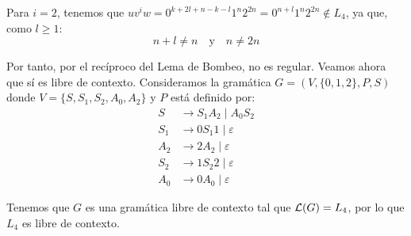 \begin{ejercicio}
\begin{enumerate}
        Para $i=2$, tenemos que $uv^iw=0^{k+2l+n-k-l}1^n2^{2n}=0^{n+l}1^n2^{2n}\notin L_4$, ya que, como $l\geq 1$:
        \begin{equation*}
            n+l\neq n \quad \text{y} \quad n\neq 2n
        \end{equation*}

        Por tanto, por el recíproco del Lema de Bombeo, no es regular. Veamos ahora que sí es libre de contexto. Consideramos la gramática $G=(V,\{0,1,2\},P,S)$ donde $V=\{S,S_1,S_2,A_0,A_2\}$ y $P$ está definido por:
        \begin{align*}
            S &\rightarrow S_1 A_2 \mid A_0 S_2 \\
            S_1 &\rightarrow 0S_1 1 \mid \varepsilon \\
            A_2 &\rightarrow 2 A_2 \mid \varepsilon \\
            S_2 &\rightarrow 1S_2 2 \mid \varepsilon \\
            A_0 &\rightarrow 0 A_0 \mid \varepsilon
        \end{align*}

        Tenemos que $G$ es una gramática libre de contexto tal que $\mathcal{L}(G)=L_4$, por lo que $L_4$ es libre de contexto.
    \end{enumerate}
\end{ejercicio}

